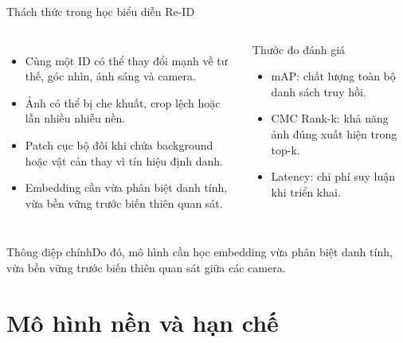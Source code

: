 \documentclass[aspectratio=169,10pt]{beamer}
\newcommand{\keymessage}[1]{\begin{block}{Thông điệp chính}#1\end{block}}
\begin{document}
\begin{frame}{Thách thức trong học biểu diễn Re-ID}
  \begin{columns}[T,onlytextwidth]
    \begin{itemize}
      \item Cùng một ID có thể thay đổi mạnh về tư thế, góc nhìn, ánh sáng và camera.
      \item Ảnh có thể bị che khuất, crop lệch hoặc lẫn nhiều nhiễu nền.
      \item Patch cục bộ đôi khi chứa background hoặc vật cản thay vì tín hiệu định danh.
      \item Embedding cần vừa phân biệt danh tính, vừa bền vững trước biến thiên quan sát.
    \end{itemize}
    \begin{block}{Thước đo đánh giá}
      \begin{itemize}
        \item mAP: chất lượng toàn bộ danh sách truy hồi.
        \item CMC Rank-k: khả năng ảnh đúng xuất hiện trong top-k.
        \item Latency: chi phí suy luận khi triển khai.
      \end{itemize}
    \end{block}
  \end{columns}
  \vspace{.12cm}
  \keymessage{Do đó, mô hình cần học embedding vừa phân biệt danh tính, vừa bền vững trước biến thiên quan sát giữa các camera.}
\end{frame}

\section{Mô hình nền và hạn chế}
\end{document}
